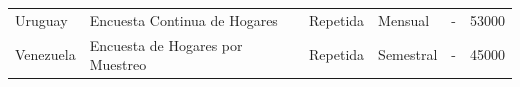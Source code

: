 \begin{longtable}[]{@{}llllll@{}}
\begin{minipage}[t]{0.13\columnwidth}\raggedright
Uruguay\strut
\end{minipage} & \begin{minipage}[t]{0.38\columnwidth}\raggedright
Encuesta Continua de Hogares\strut
\end{minipage} & \begin{minipage}[t]{0.06\columnwidth}\raggedright
Repetida\strut
\end{minipage} & \begin{minipage}[t]{0.08\columnwidth}\raggedright
Mensual\strut
\end{minipage} & \begin{minipage}[t]{0.06\columnwidth}\raggedright
-\strut
\end{minipage} & \begin{minipage}[t]{0.13\columnwidth}\raggedright
53000\strut
\end{minipage}\tabularnewline
\begin{minipage}[t]{0.13\columnwidth}\raggedright
Venezuela\strut
\end{minipage} & \begin{minipage}[t]{0.38\columnwidth}\raggedright
Encuesta de Hogares por Muestreo\strut
\end{minipage} & \begin{minipage}[t]{0.06\columnwidth}\raggedright
Repetida\strut
\end{minipage} & \begin{minipage}[t]{0.08\columnwidth}\raggedright
Semestral\strut
\end{minipage} & \begin{minipage}[t]{0.06\columnwidth}\raggedright
-\strut
\end{minipage} & \begin{minipage}[t]{0.13\columnwidth}\raggedright
45000\strut
\end{minipage}\tabularnewline
\bottomrule
\end{longtable}

\newpage

